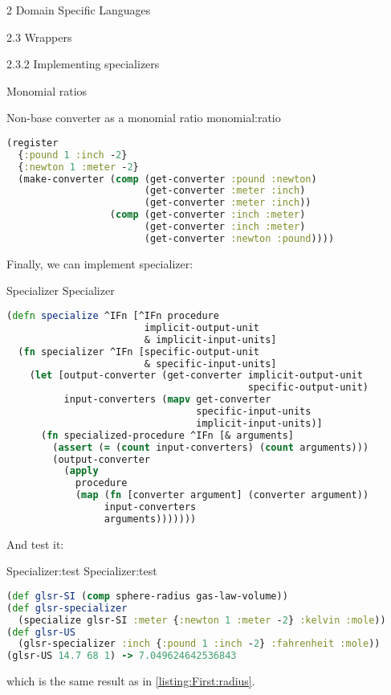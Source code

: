 \documentclass[12pt]{PalisadesLakesBook}
\begin{document}
\begin{plSection}{2 Domain Specific Languages}
\begin{plSection}{2.3 Wrappers}
\begin{plSection}{2.3.2 Implementing specializers}
\begin{plSection}{Monomial ratios}
\begin{plListing}
{Non-base converter as a monomial ratio}
{monomial:ratio}
\begin{lstlisting}[language=clojure]
(register 
  {:pound 1 :inch -2}
  {:newton 1 :meter -2}
  (make-converter (comp (get-converter :pound :newton)
                        (get-converter :meter :inch)
                        (get-converter :meter :inch))
                  (comp (get-converter :inch :meter) 
                        (get-converter :inch :meter) 
                        (get-converter :newton :pound))))
\end{lstlisting}
\end{plListing}
\end{plSection}%

Finally, we can implement {\clojureFont specializer}:

\begin{plListing}
{Specializer}
{Specializer}
\begin{lstlisting}[language=clojure]
(defn specialize ^IFn [^IFn procedure
                        implicit-output-unit
                        & implicit-input-units]
  (fn specializer ^IFn [specific-output-unit
                        & specific-input-units]
    (let [output-converter (get-converter implicit-output-unit
                                          specific-output-unit)
          input-converters (mapv get-converter 
                                 specific-input-units
                                 implicit-input-units)]
      (fn specialized-procedure ^IFn [& arguments]
        (assert (= (count input-converters) (count arguments)))
        (output-converter
          (apply 
            procedure
            (map (fn [converter argument] (converter argument))
                 input-converters
                 arguments)))))))
\end{lstlisting}
\end{plListing}

And test it:
\begin{plListing}
{Specializer:test}
{Specializer:test}
\begin{lstlisting}[language=clojure]
(def glsr-SI (comp sphere-radius gas-law-volume))
(def glsr-specializer 
  (specialize glsr-SI :meter {:newton 1 :meter -2} :kelvin :mole))
(def glsr-US 
  (glsr-specializer :inch {:pound 1 :inch -2} :fahrenheit :mole))
(glsr-US 14.7 68 1) -> 7.049624642536843
\end{lstlisting}
\end{plListing}
which is the same result as in \cref{listing:First:radius}.


\end{plSection}
\end{plSection}
\end{plSection}
\end{document}
